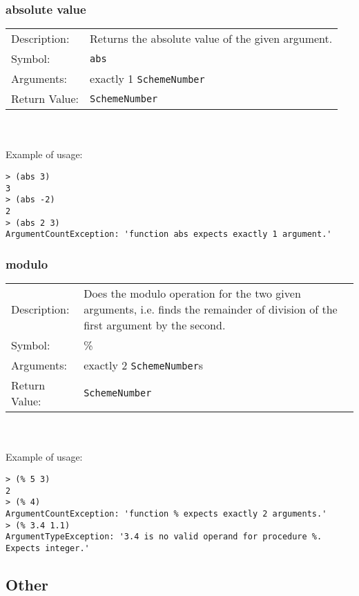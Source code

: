 \documentclass[12pt,a4paper]{scrartcl}
\begin{document}
\subsubsection{absolute value}
\begin{tabular}{l  p{13cm}}
Description: & Returns the absolute value of the given argument.\\
Symbol: & \lstinline{abs}\\
Arguments: & exactly 1 \lstinline{SchemeNumber}\\
Return Value: & \lstinline{SchemeNumber}
\end{tabular}
\\
\\
Example of usage:
\begin{lstlisting}
> (abs 3)
3
> (abs -2)
2
> (abs 2 3)
ArgumentCountException: 'function abs expects exactly 1 argument.'
\end{lstlisting}

\subsubsection{modulo}
\begin{tabular}{l  p{13cm}}
Description: & Does the modulo operation for the two given arguments, i.e. finds the remainder of division of the first argument by the second.\\
Symbol: & \%\\
Arguments: & exactly 2 \lstinline{SchemeNumber}s\\
Return Value: & \lstinline{SchemeNumber}
\end{tabular}
\\
\\
Example of usage:
\begin{lstlisting}
> (% 5 3)
2
> (% 4)
ArgumentCountException: 'function % expects exactly 2 arguments.'
> (% 3.4 1.1)
ArgumentTypeException: '3.4 is no valid operand for procedure %. Expects integer.' 
\end{lstlisting}

\subsection{Other}
\end{document}
